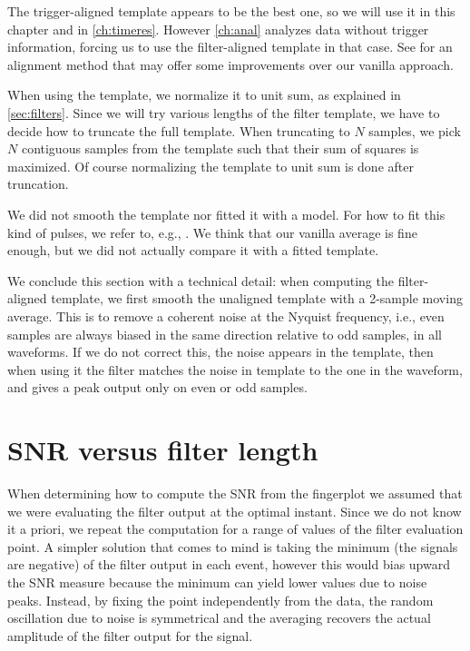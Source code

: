 The trigger-aligned template appears to be the best one, so we will use it in
this chapter and in \autoref{ch:timeres}. However \autoref{ch:anal} analyzes
data without trigger information, forcing us to use the filter-aligned template
in that case. See \cite{coakley2001} for an alignment method that may offer
some improvements over our vanilla approach.

When using the template, we normalize it to unit sum, as explained in
\autoref{sec:filters}. Since we will try various lengths of the filter
template, we have to decide how to truncate the full template. When truncating
to $N$ samples, we pick $N$ contiguous samples from the template such that
their sum of squares is maximized. Of course normalizing the template to unit
sum is done after truncation.

We did not smooth the template nor fitted it with a model. For how to fit this
kind of pulses, we refer to, e.g., \cite{luzzi2020}. We think that our vanilla
average is fine enough, but we did not actually compare it with a fitted
template.

We conclude this section with a technical detail: when computing the
filter-aligned template, we first smooth the unaligned template with a 2-sample
moving average. This is to remove a coherent noise at the Nyquist frequency,
i.e., even samples are always biased in the same direction relative to odd
samples, in all waveforms. If we do not correct this, the noise appears in the
template, then when using it the filter matches the noise in template to the
one in the waveform, and gives a peak output only on even or odd samples.

\section{SNR versus filter length}

When determining how to compute the SNR from the fingerplot we assumed that we
were evaluating the filter output at the optimal instant. Since we do not know
it a priori, we repeat the computation for a range of values of the filter
evaluation point. A simpler solution that comes to mind is taking the minimum
(the signals are negative) of the filter output in each event, however this
would bias upward the SNR measure because the minimum can yield lower values
due to noise peaks. Instead, by fixing the point independently from the data,
the random oscillation due to noise is symmetrical and the averaging recovers
the actual amplitude of the filter output for the signal.

